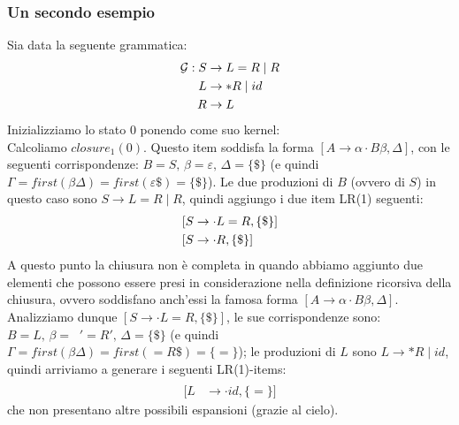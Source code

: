 \documentclass[class=book, crop=false, oneside, 12pt]{standalone}
\begin{document}
\subsubsection{Un secondo esempio}
\label{ex:closure-lr1}
Sia data la seguente grammatica:
\begin{align}
    \mathcal{G}: S &\to L=R \mid R \\
    L &\to *R \mid id \nonumber \\ \notag
    R &\to L \notag
\end{align}
Inizializziamo lo stato 0 ponendo come suo kernel:
\begin{equation*}
    [S' \to \cdot S, \{\$\}]
\end{equation*}
Calcoliamo \(closure_1(0)\). Questo item soddisfa la forma \([A \rightarrow \alpha \cdot B \beta, \Delta]\), con le seguenti corrispondenze: \(B = S \texttt{, } \beta = \varepsilon \texttt{, } \Delta = \{\$\}\) (e quindi \(\Gamma = first(\beta \Delta) = first(\varepsilon \$) = \{\$\}\)).
Le due produzioni di \(B\) (ovvero di \(S\)) in questo caso sono \(S \to L=R \mid R\), quindi aggiungo i due item LR(1) seguenti:
\begin{align}
    \label{prod:production-L}
    [S &\to \cdot L = R, \{\$\}] \\
    [S &\to \cdot R, \{\$\}] \notag
\end{align}
A questo punto la chiusura non è completa in quando abbiamo aggiunto due elementi che possono essere presi in considerazione nella definizione ricorsiva della chiusura, ovvero soddisfano anch'essi la famosa forma \([A \rightarrow \alpha \cdot B \beta, \Delta]\).
Analizziamo dunque \([S \to \cdot L = R, \{\$\}]\), le sue corrispondenze sono: \(B = L \texttt{, } \beta = \; \; '=R' \texttt{, } \Delta = \{\$\}\) (e quindi \(\Gamma = first(\beta \Delta) = first(=R\$) = \{=\}\)); le produzioni di \(L\) sono \(L \to *R \mid id\), quindi arriviamo a generare i seguenti LR(1)-items:
\begin{align*}
    [L &\to \cdot *R, \{=\}] \\
    [L &\to \cdot id, \{=\}]
\end{align*}
che non presentano altre possibili espansioni (grazie al cielo).
\end{document}
